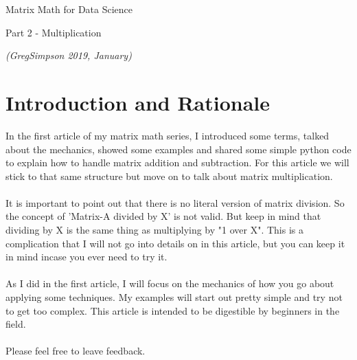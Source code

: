 \documentclass{article}
\begin{document}
\centerline{\sc \large Matrix Math for Data Science }
\vspace{.5pc}
\centerline{\sc Part 2 - Multiplication}
\centerline{\it (GregSimpson 2019, January)}
\vspace{2pc}


\section{Introduction and Rationale}
In the first article of my matrix math series, I introduced some terms, talked about the mechanics, showed some examples and shared some simple python code to explain how to handle matrix addition and subtraction.
For this article we will stick to that same structure but move on to talk about matrix multiplication.
\\
\\
It is important to point out that there is no literal version of matrix division.
So the concept of 'Matrix-A divided by X' is not valid.
But keep in mind that dividing by X is the same thing as multiplying by "1 over X".
This is a complication that I will not go into details on in this article, but you can keep it in mind incase you ever need to try it.
\\
\\
As I did in the first article, I will focus on the mechanics of how you go about applying some techniques.  My examples will start out pretty simple and try not to get too complex.   This article is intended to be digestible by beginners in the field.
\\
\\
 Please feel free to leave feedback.
\\
\vspace{3pc}





\newpage
\end{document}
